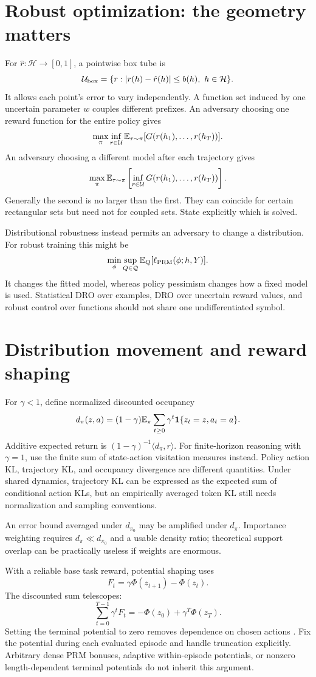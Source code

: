 \section{Robust optimization: the geometry matters}
For $\hat r:\mathcal H\to[0,1]$, a pointwise box tube is
\[
 \mathcal{U}_{\rm box}=\{r: |r(h)-\hat r(h)|\le b(h),\ h\in\mathcal H\}.
\]
It allows each point's error to vary independently. A function set induced by
one uncertain parameter $w$ couples different prefixes. An adversary choosing
one reward function for the entire policy gives
\[
 \max_\pi\inf_{r\in\mathcal{U}}\mathbb{E}_{\tau\sim\pi}[G(r(h_1),\ldots,r(h_T))].
\]
An adversary choosing a different model after each trajectory gives
\[
 \max_\pi\mathbb{E}_{\tau\sim\pi}\left[\inf_{r\in\mathcal{U}}G(r(h_1),\ldots,r(h_T))\right].
\]
Generally the second is no larger than the first. They can coincide for certain
rectangular sets but need not for coupled sets. State explicitly which is solved.

Distributional robustness instead permits an adversary to change a distribution.
For robust training this might be
\[
 \min_\phi\sup_{Q\in\mathcal Q}\mathbb{E}_Q[\ell_{\rm PRM}(\phi;h,Y)].
\]
It changes the fitted model, whereas policy pessimism changes how a fixed model
is used. Statistical DRO over examples, DRO over uncertain reward values, and
robust control over functions should not share one undifferentiated symbol.

\section{Distribution movement and reward shaping}
For $\gamma<1$, define normalized discounted occupancy
\[
 d_\pi(z,a)=(1-\gamma)\mathbb{E}_\pi\sum_{t\ge0}\gamma^t
 \mathbf{1}\{z_t=z,a_t=a\}.
\]
Additive expected return is $(1-\gamma)^{-1}\langle d_\pi,r\rangle$.
For finite-horizon reasoning with $\gamma=1$, use the finite sum of state-action
visitation measures instead. Policy action KL, trajectory KL, and occupancy
divergence are different quantities. Under shared dynamics, trajectory KL can
be expressed as the expected sum of conditional action KLs, but an empirically
averaged token KL still needs normalization and sampling conventions.

An error bound averaged under $d_{\pi_0}$ may be amplified under $d_\pi$.
Importance weighting requires $d_\pi\ll d_{\pi_0}$ and a usable density ratio;
theoretical support overlap can be practically useless if weights are enormous.

With a reliable base task reward, potential shaping uses
\[
 F_t=\gamma\Phi(z_{t+1})-\Phi(z_t).
\]
The discounted sum telescopes:
\[
 \sum_{t=0}^{T-1}\gamma^tF_t=-\Phi(z_0)+\gamma^T\Phi(z_T).
\]
Setting the terminal potential to zero removes dependence on chosen actions
\cite{shaping}. Fix the potential during each evaluated episode and handle
truncation explicitly. Arbitrary dense PRM bonuses, adaptive within-episode
potentials, or nonzero length-dependent terminal potentials do not inherit this
argument.

